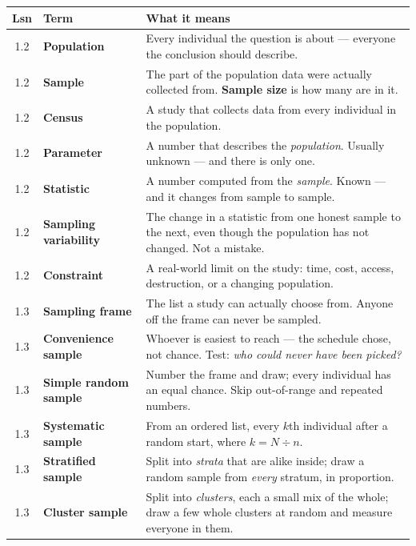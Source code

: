 \documentclass[10pt]{article}
\begin{document}
\vspace{4pt}
\boxguard[16]
\begin{tabularx}{\linewidth}{@{} c >{\raggedright\arraybackslash\bfseries}p{3.5cm} X @{}}
\rowcolor{frost}
\textbf{Lsn} & \textbf{Term} & \textbf{What it means} \\
\midrule
1.2 & Population & Every individual the question is about --- everyone the
      conclusion should describe. \\
1.2 & Sample & The part of the population data were actually collected from.
      \textbf{Sample size} is how many are in it. \\
1.2 & Census & A study that collects data from every individual in the
      population. \\
1.2 & Parameter & A number that describes the \emph{population}. Usually unknown
      --- and there is only one. \\
1.2 & Statistic & A number computed from the \emph{sample}. Known --- and it
      changes from sample to sample. \\
1.2 & Sampling variability & The change in a statistic from one honest sample to the
      next, even though the population has not changed. Not a mistake. \\
1.2 & Constraint & A real-world limit on the study: time, cost, access,
      destruction, or a changing population. \\
1.3 & Sampling frame & The list a study can actually choose from. Anyone off the
      frame can never be sampled. \\
1.3 & Convenience sample & Whoever is easiest to reach --- the schedule chose,
      not chance. Test: \emph{who could never have been picked?} \\
1.3 & Simple random sample & Number the frame and draw; every individual has an
      equal chance. Skip out-of-range and repeated numbers. \\
1.3 & Systematic sample & From an ordered list, every $k$th individual after a
      random start, where $k = N \div n$. \\
1.3 & Stratified sample & Split into \emph{strata} that are alike inside; draw a
      random sample from \emph{every} stratum, in proportion. \\
1.3 & Cluster sample & Split into \emph{clusters}, each a small mix of the whole;
      draw a few whole clusters at random and measure everyone in them. \\
\end{tabularx}
\end{document}

